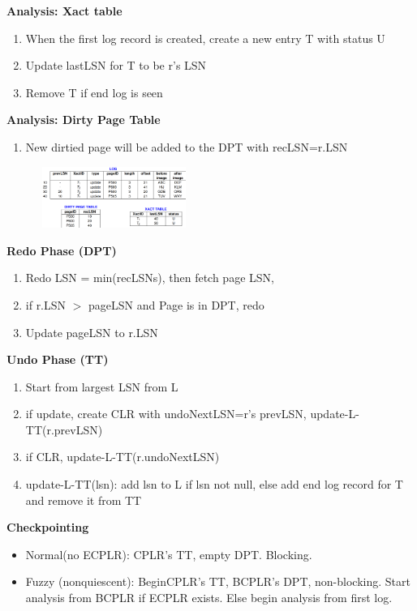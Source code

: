\documentclass[10pt, landscape]{article}
\begin{document}
\begin{multicols}{4}
\textbf{Analysis: Xact table} \\
\begin{enumerate}
  \item When the first log record is created, create a new entry T with status U
  \item Update lastLSN for T to be r's LSN
  \item Remove T if end log is seen
\end{enumerate}

\textbf{Analysis: Dirty Page Table} \\
\begin{enumerate}
  \item New dirtied page will be added to the DPT with recLSN=r.LSN
\end{enumerate}

\includegraphics[width=7cm, height =2cm]{analysis_log.png}

\textbf{Redo Phase (DPT)} \\
\begin{enumerate}
  \item Redo LSN = min(recLSNs), then fetch page LSN, 
  \item if r.LSN $>$ pageLSN and Page is in DPT, redo
  \item Update pageLSN to r.LSN
\end{enumerate}

\textbf{Undo Phase (TT)} \\
\begin{enumerate}
  \item Start from largest LSN from L
  \item if update, create CLR with undoNextLSN=r's prevLSN, update-L-TT(r.prevLSN)
  \item if CLR, update-L-TT(r.undoNextLSN)
  \item update-L-TT(lsn): add lsn to L if lsn not null, else add end log record for T and remove it from TT
\end{enumerate}

\textbf{Checkpointing} \\
\begin{itemize}
  \item Normal(no ECPLR): CPLR's TT, empty DPT. Blocking.
  \item Fuzzy (nonquiescent): BeginCPLR's TT, BCPLR's DPT, non-blocking. Start analysis from BCPLR if ECPLR exists. Else begin analysis from first log.
\end{itemize}

\end{multicols}
\end{document}
